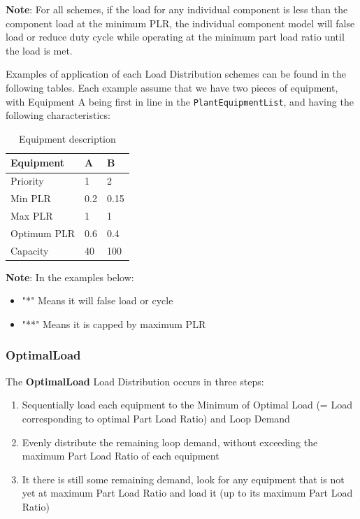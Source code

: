 \textbf{Note}: For all schemes, if the load for any individual component is less than the component load at the minimum PLR, the individual component model will false load or reduce duty cycle while operating at the minimum part load ratio until the load is met.

Examples of application of each Load Distribution schemes can be found in the following tables.
Each example assume that we have two pieces of equipment, with Equipment A being first in line in the \lstinline!PlantEquipmentList!, and having the following characteristics:

\begin{table}[htbp]
    \centering
    \caption{Equipment description}
    \label{tab:example-load-distribution-eq}
\begin{tabular}{|l|l|l|}
\hline
Equipment   & A   & B   \\ \hline
Priority    & 1   & 2   \\ \hline
Min PLR     & 0.2 & 0.15 \\ \hline
Max PLR     & 1   & 1   \\ \hline
Optimum PLR & 0.6 & 0.4 \\ \hline
Capacity    & 40  & 100 \\ \hline
\end{tabular}
\end{table}

\textbf{Note}: In the examples below:

\begin{itemize}
\item
    "*" Means it will false load or cycle
\item
    "**" Means it is capped by maximum PLR
\end{itemize}


\subsubsection{OptimalLoad}%
\label{ssub:optimalload}

The \textbf{OptimalLoad} Load Distribution occurs in three steps:

\begin{enumerate}
    \def\labelenumi{Step \arabic{enumi}:}
\item
    Sequentially load each equipment to the Minimum of Optimal Load (= Load corresponding to optimal Part Load Ratio) and Loop Demand
\item
    Evenly distribute the remaining loop demand, without exceeding the maximum Part Load Ratio of each equipment
\item
    It there is still some remaining demand, look for any equipment that is not yet at maximum Part Load Ratio and load it (up to its maximum Part Load Ratio)
\end{enumerate}

